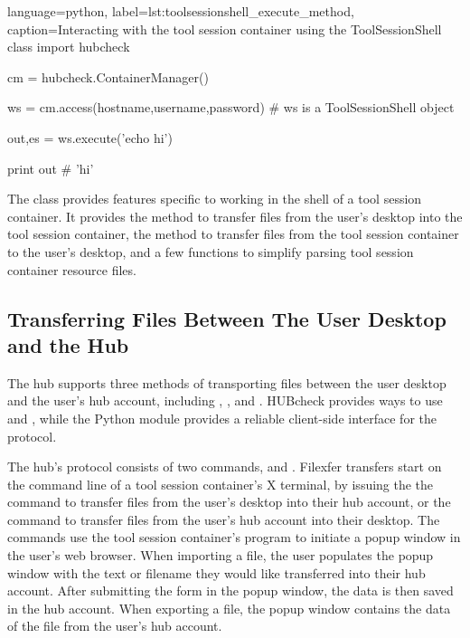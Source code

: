 \begin{xcode}{%
  language=python,%
  label=lst:toolsessionshell_execute_method,%
  caption={Interacting with the tool session container using the ToolSessionShell class}%
}
import hubcheck

cm = hubcheck.ContainerManager()

ws = cm.access(hostname,username,password)
# ws is a ToolSessionShell object

out,es = ws.execute('echo hi')

print out
# 'hi'
\end{xcode}

The  class provides features specific to working in the shell
of a tool session container. It provides the  method to
transfer files from the user's desktop into the tool session container, the
 method to transfer files from the tool session container
to the user's desktop, and a few functions to simplify parsing tool session
container resource files.


\subsection{Transferring Files Between The User Desktop and the Hub}
\label{ssec:hubcheck_shell_modules_sftp}

The hub supports three methods of transporting files between the user desktop
and the user's hub account, including ,
, and . HUBcheck provides ways to use
 and , while the Python module
 \cite{WebDAVLib:Online} provides a reliable client-side
interface for the  \cite{WebDAV:Online} protocol.



The hub's  protocol consists of two commands,
 and . Filexfer transfers
start on the command line of a tool session container's X terminal, by issuing
the the  command to transfer files from the user's
desktop into their hub account, or the  command
to transfer files from the user's hub account into their desktop. The
 commands use the tool session container's
 program to initiate a popup window in the user's
web browser. When importing a file, the user populates the popup window with
the text or filename they would like transferred into their hub account. After
submitting the form in the popup window, the data is then saved in the hub
account. When exporting a file, the popup window contains the data of the file
from the user's hub account.

